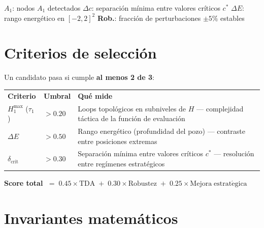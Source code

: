 \documentclass[11pt, a4paper]{article}
\newcommand{\TH}[1]{\cellcolor{cTHbg}\color{white}\textbf{#1}}
\begin{document}
\smallskip
\begin{tcolorbox}[quotebox]
  \textbf{$A_1$}: nodos $A_1$ detectados \;\textbullet\;
  \textbf{$\Delta c$}: separaci\'on m\'inima entre valores cr\'iticos $c^*$
  \;\textbullet\;
  \textbf{$\Delta E$}: rango energ\'etico en $[-2,2]^2$
  \;\textbullet\;
  \textbf{Rob.}: fracci\'on de perturbaciones $\pm 5\%$ estables
\end{tcolorbox}

\section{Criterios de selecci\'on}

Un candidato pasa si cumple \textbf{al menos 2 de 3}:

\medskip
\begin{center}
\begin{tabularx}{0.96\textwidth}{L{3.2cm}C{2cm}X}
  \TH{Criterio} & \TH{Umbral} & \TH{Qu\'e mide} \\[1pt]
  $H_1^{\max}$ ($\tau_1$)
    & $> 0.20$
    & Loops topol\'ogicos en subniveles de $H$ ---
      complejidad t\'actica de la funci\'on de evaluaci\'on \\
  $\Delta E$
    & $> 0.50$
    & Rango energ\'etico (profundidad del pozo) ---
      contraste entre posiciones extremas \\
  $\delta_{\mathrm{crit}}$
    & $> 0.30$
    & Separaci\'on m\'inima entre valores cr\'iticos $c^*$ ---
      resoluci\'on entre reg\'imenes estrat\'egicos \\
\end{tabularx}
\end{center}

\medskip
\textbf{Score total}
$\;=\; 0.45 \times \mathrm{TDA}
   \;+\; 0.30 \times \mathrm{Robustez}
   \;+\; 0.25 \times \mathrm{Mejora\;estrat\acute{e}gica}$

\section{Invariantes matem\'aticos}
\end{document}
